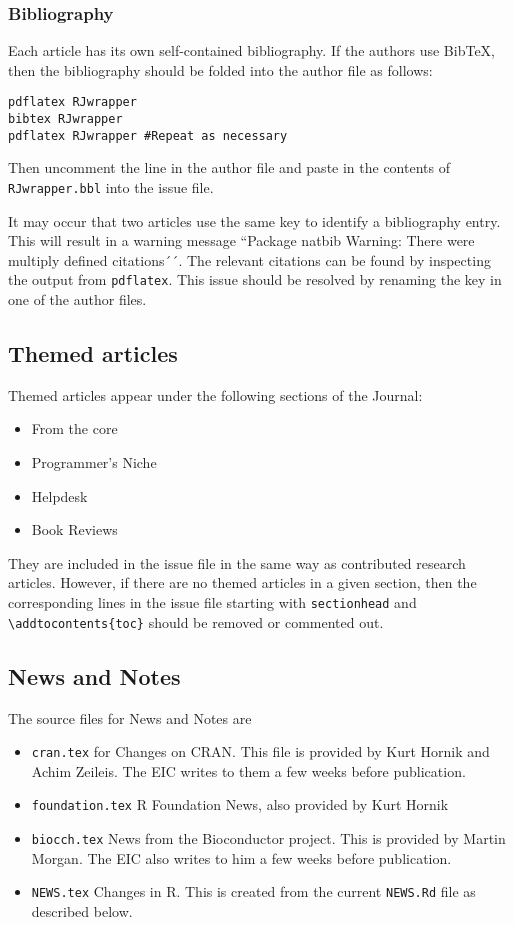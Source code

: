 \documentclass[11pt]{article}
\begin{document}
\subsubsection{Bibliography}

Each article has its own self-contained bibliography.  If the authors
use BibTeX, then the bibliography should be folded into the author file
as follows:
\begin{verbatim}
pdflatex RJwrapper
bibtex RJwrapper
pdflatex RJwrapper #Repeat as necessary
\end{verbatim}
Then uncomment the line \verb++ in the author
file and paste in the contents of \texttt{RJwrapper.bbl} into the
issue file.

It may occur that two articles use the same key to identify a
bibliography entry. This will result in a warning message ``Package
natbib Warning: There were multiply defined citations´´.  The relevant
citations can be found by inspecting the output from
\texttt{pdflatex}.  This issue should be resolved by renaming the key
in one of the author files.

\subsection{Themed articles}

Themed articles appear under the following sections of the Journal:
\begin{itemize}
\item From the core
\item Programmer's Niche
\item Helpdesk
\item Book Reviews
\end{itemize}
They are included in the issue file in the same way as contributed
research articles. However, if there are no themed articles in a given
section, then the corresponding lines in the issue file starting with
\verb+sectionhead+ and \verb+\addtocontents{toc}+ should be removed or
commented out.

\subsection{News and Notes}

The source files for News and Notes are
\begin{itemize}
\item \texttt{cran.tex} for Changes on CRAN. This file is provided by
  Kurt Hornik and Achim Zeileis. The EIC writes to them a few weeks
  before publication.
\item \texttt{foundation.tex} R Foundation News, also provided by Kurt Hornik
\item \texttt{biocch.tex} News from the Bioconductor project. This is
  provided by Martin Morgan. The EIC also writes to him a few weeks
  before publication.
\item \texttt{NEWS.tex} Changes in R.  This is created from the current
  \texttt{NEWS.Rd} file as described below.
\end{itemize}
\end{document}
